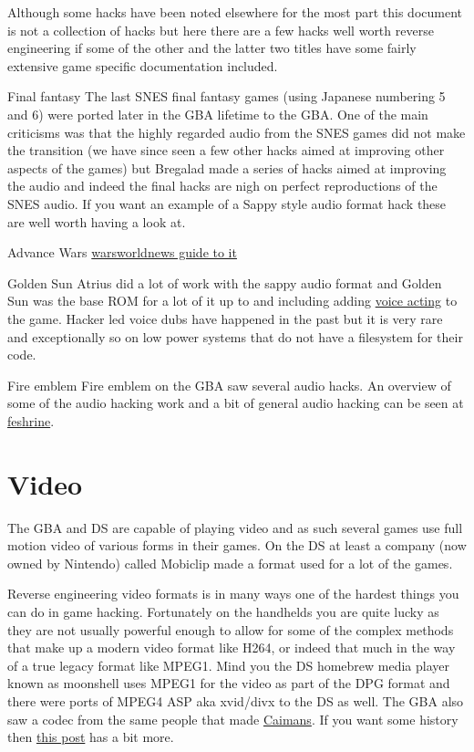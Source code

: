 \documentclass[
]{book}
\begin{document}
Although some hacks have been noted elsewhere for the most part this document is not a collection of hacks but here there are a few hacks well worth reverse engineering if some of the other and the latter two titles have some fairly extensive game specific documentation included.

Final fantasy The last SNES final fantasy games (using Japanese numbering 5 and 6) were ported later in the GBA lifetime to the GBA. One of the main criticisms was that the highly regarded audio from the SNES games did not make the transition (we have since seen a few other hacks aimed at improving other aspects of the games) but Bregalad made a series of hacks aimed at improving the audio and indeed the final hacks are nigh on perfect reproductions of the SNES audio. If you want an example of a Sappy style audio format hack these are well worth having a look at.

Advance Wars \href{http://forums.warsworldnews.com/viewtopic.php?t=2002}{warsworldnews guide to it}

Golden Sun Atrius did a lot of work with the sappy audio format and Golden Sun was the base ROM for a lot of it up to and including adding \href{http://forum.goldensunhacking.net/index.php?action=downloads;sa=view;down=4}{voice acting} to the game. Hacker led voice dubs have happened in the past but it is very rare and exceptionally so on low power systems that do not have a filesystem for their code.

Fire emblem Fire emblem on the GBA saw several audio hacks. An overview of some of the audio hacking work and a bit of general audio hacking can be seen at \href{http://www.feshrine.net/ultimatetutorial/}{feshrine}.

\hypertarget{video}{%
\section{Video}\label{video}}

The GBA and DS are capable of playing video and as such several games use full motion video of various forms in their games. On the DS at least a company (now owned by Nintendo) called Mobiclip made a format used for a lot of the games.

Reverse engineering video formats is in many ways one of the hardest things you can do in game hacking. Fortunately on the handhelds you are quite lucky as they are not usually powerful enough to allow for some of the complex methods that make up a modern video format like H264, or indeed that much in the way of a true legacy format like MPEG1. Mind you the DS homebrew media player known as moonshell uses MPEG1 for the video as part of the DPG format and there were ports of MPEG4 ASP aka xvid/divx to the DS as well. The GBA also saw a codec from the same people that made \href{http://www.ds-video.com/index.htm}{Caimans}. If you want some history then \href{http://gbatemp.net/threads/video-codec-for-gba.354591/\#post-5038482}{this post} has a bit more.
\end{document}
